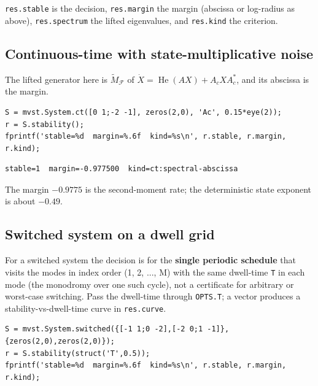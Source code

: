 \documentclass[11pt,oneside]{report}
\newcommand{\code}[1]{\texttt{#1}}
\begin{document}
\code{res.stable} is the decision, \code{res.margin} the margin (abscissa or log-radius as
above), \code{res.spectrum} the lifted eigenvalues, and \code{res.kind} the criterion.

\hypertarget{continuous-time-with-state-multiplicative-noise}{%
\subsection{Continuous-time with state-multiplicative noise}\label{continuous-time-with-state-multiplicative-noise}}

The lifted generator here is
\(\widetilde M_{\mathcal{F}}\) of \(\dot X=\operatorname{He}(AX)+A_c X A_c^{*}\), and
its abscissa is the margin.

\begin{lstlisting}[style=matlabstyle]
S = mvst.System.ct([0 1;-2 -1], zeros(2,0), 'Ac', 0.15*eye(2));
r = S.stability();
fprintf('stable=%d  margin=%.6f  kind=%s\n', r.stable, r.margin, r.kind);
\end{lstlisting}

\begin{lstlisting}[style=outputstyle]
stable=1  margin=-0.977500  kind=ct:spectral-abscissa
\end{lstlisting}

The margin \(-0.9775\) is the second-moment rate; the deterministic state exponent
is about \(-0.49\).

\hypertarget{switched-system-on-a-dwell-grid}{%
\subsection{Switched system on a dwell grid}\label{switched-system-on-a-dwell-grid}}

For a switched system the decision is for the \textbf{single periodic schedule} that
visits the modes in index order (1, 2, ..., M) with the same dwell-time \code{T} in
each mode (the monodromy over one such cycle), not a certificate for arbitrary
or worst-case switching. Pass the dwell-time through \code{OPTS.T}; a vector produces
a stability-vs-dwell-time curve in \code{res.curve}.

\begin{lstlisting}[style=matlabstyle]
S = mvst.System.switched({[-1 1;0 -2],[-2 0;1 -1]}, {zeros(2,0),zeros(2,0)});
r = S.stability(struct('T',0.5));
fprintf('stable=%d  margin=%.6f  kind=%s\n', r.stable, r.margin, r.kind);
\end{lstlisting}
\end{document}
